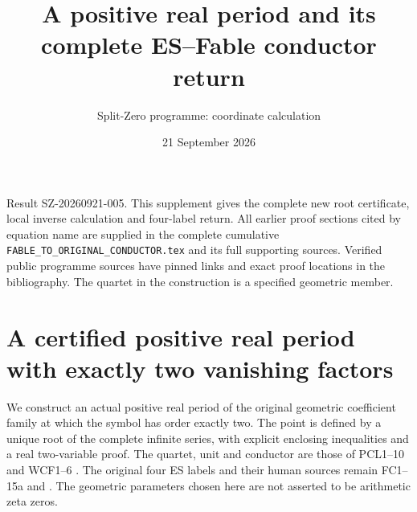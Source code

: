 \documentclass[11pt]{article}
\title{A positive real period and its complete ES--Fable conductor return}
\author{Split-Zero programme: coordinate calculation}
\date{21 September 2026}
\begin{document}
\maketitle
\noindent Result SZ-20260921-005. This supplement gives the complete
new root certificate, local inverse calculation and four-label return.
All earlier proof sections cited by equation name are supplied in the
complete cumulative \texttt{FABLE\_TO\_ORIGINAL\_CONDUCTOR.tex}
and its full supporting sources. Verified public programme sources
have pinned links and exact proof locations in the bibliography.
The quartet in the construction is a specified geometric member.
\tableofcontents
\clearpage
\section{A certified positive real period with exactly two vanishing factors}
\label{sec:real-pair-zero}
We construct an actual positive real period of the original geometric
coefficient family at which the symbol has order exactly two. The
point is defined by a unique root of the complete infinite series,
with explicit enclosing inequalities and a real two-variable proof.
The quartet, unit and conductor are those of PCL1--10 and WCF1--6
\cite{PCLOriginal,WCF}. The original four ES labels and their human
sources remain FC1--15a and \cite{ES488}. The geometric parameters
chosen here are not asserted to be arithmetic zeta zeros.
\end{document}
